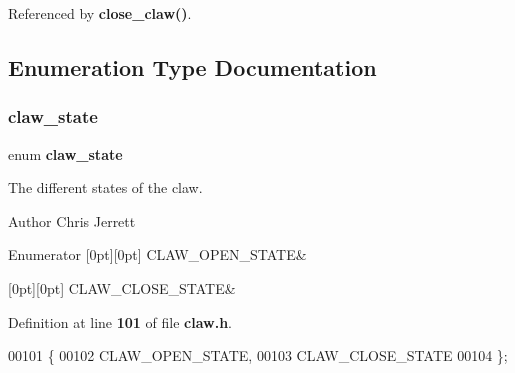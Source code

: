 Referenced by \textbf{ close\+\_\+claw()}.



\subsection{Enumeration Type Documentation}
\mbox{\label{claw_8h_a600668fd307d596c3812126657335324}} 
\subsubsection{claw\+\_\+state}
{\footnotesize\ttfamily enum \textbf{ claw\+\_\+state}}



The different states of the claw. 

\begin{DoxyAuthor}{Author}
Chris Jerrett 
\end{DoxyAuthor}
\begin{DoxyEnumFields}{Enumerator}
[0pt][0pt]{}\mbox{\label{claw_8h_a600668fd307d596c3812126657335324ab871ce9ec2796d275c09bf01abcac2cd}} 
C\+L\+A\+W\+\_\+\+O\+P\+E\+N\+\_\+\+S\+T\+A\+TE&\\
\hline

[0pt][0pt]{}\mbox{\label{claw_8h_a600668fd307d596c3812126657335324a3948a2d760f710e9087edded3df98b5f}} 
C\+L\+A\+W\+\_\+\+C\+L\+O\+S\+E\+\_\+\+S\+T\+A\+TE&\\
\hline

\end{DoxyEnumFields}


Definition at line \textbf{ 101} of file \textbf{ claw.\+h}.


\begin{DoxyCode}
00101                 \{
00102   CLAW_OPEN_STATE,
00103   CLAW_CLOSE_STATE
00104 \};
\end{DoxyCode}



